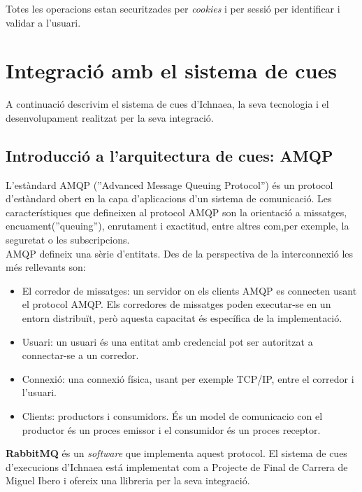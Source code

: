 Totes les operacions estan securitzades per \textit{cookies}\cite{cookies} i per sessió per identificar i validar a l'usuari.\cite{sessions}

\section{Integraci\'{o} amb el sistema de cues}
A continuació descrivim el sistema de cues d'Ichnaea, la seva tecnologia i el desenvolupament realitzat per la seva integració.\\

\subsection{Introducci\'{o} a l'arquitectura de cues: AMQP}
\label{sec:queue_system_overview}
L'est\`{a}ndard AMQP (''Advanced Message Queuing Protocol'') \'{e}s un protocol d'est\`{a}ndard obert en la capa d'aplicacions d'un sistema de comunicació. Les característiques que defineixen al protocol AMQP son la orientació a missatges, encuament(''queuing''), enrutament i exactitud, entre altres com,per exemple, la seguretat o les subscripcions.\cite{amqp}\\

AMQP defineix una s\`{e}rie d'entitats. Des de la perspectiva de la interconnexió les m\'{e}s rellevants son:
\begin{itemize}
\item El corredor de missatges: un servidor on els clients AMQP es connecten usant el protocol AMQP. Els corredores de missatges poden executar-se en un entorn distribuït, però aquesta capacitat \'{e}s espec\'{i}fica de la implementació.
\item Usuari: un usuari \'{e}s una entitat amb credencial pot ser autoritzat a connectar-se a un corredor.
\item Connexió: una connexi\'{o} f\'{i}sica, usant per exemple TCP/IP, entre el corredor i l'usuari.
\item Clients: productors i consumidors. \'{E}s un model de comunicacio con el productor \'{e}s un proces emissor  i el consumidor \'{e}s un proces receptor.\cite{messaging}
\end{itemize}

\textbf{RabbitMQ} \'{e}s un \textit{software} que implementa aquest protocol. El sistema de cues d'execucions d'Ichnaea est\'{a} implementat com a Projecte de Final de Carrera de Miguel Ibero i ofereix una llibreria per la seva integració.\\


